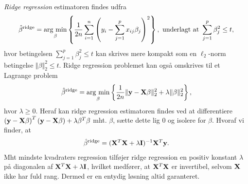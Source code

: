 \textit{Ridge regression} estimatoren findes udfra 
\begin{align} 
\hat{\beta}^\text{ridge} = \argmin_{\beta} \cbr{\frac{1}{2n} \sum_{i=1}^n \del{y_i - \sum_{j=1}^p x_{ij} \beta_j}^2}, \ \text{underlagt at } \sum_{j=1}^p \beta_j^2 \leq t, \label{eq:2.7} 
\end{align} 
hvor betingelsen $\sum_{j=1}^p \beta_j^2 \leq t$ kan skrives mere kompakt som en \(\ell_2\)-norm betingelse $\Vert \beta \Vert_2^2 \leq t$.
Ridge regression problemet kan også omskrives til et Lagrange problem
\begin{align*}
\hat{\beta}^\text{ridge} = \argmin_{\beta} \cbr{\frac{1}{2n} \Vert \y - \X \beta \Vert_2^2 + \lambda \Vert \beta \Vert_2^2},
\end{align*}
hvor $\lambda \geq 0$.
Heraf kan ridge regression estimatoren findes ved at differentiere \(\del{\y - \X \beta}^T \del{\y - \X \beta} + \lambda \beta^T \beta\) mht. $\beta$, sætte dette lig 0 og isolere for $\beta$. Hvoraf vi finder, at
\begin{align*} 
\hat{\beta}^\text{ridge} = (\mathbf{X}^T \mathbf{X} + \lambda \mathbf{I})^{-1} \mathbf{X}^T \mathbf{y}. 
\end{align*}  
Mht mindste kvadraters regression tilføjer ridge regression en positiv konstant $\lambda$ på diagonalen af $\mathbf{X}^T \mathbf{X} + \lambda \mathbf{I}$, hvilket medfører, at \(\mathbf{X}^T \mathbf{X}\) er invertibel, selvom $\mathbf{X}$ ikke har fuld rang. 
Dermed er en entydig løsning altid garanteret. 

